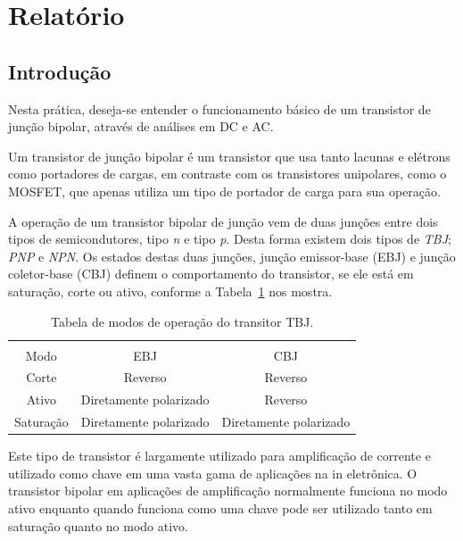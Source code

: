 \documentclass[12pt,a4paper]{article}
\begin{document}
\setcounter{figure}{2}
\setcounter{section}{3}
\setcounter{page}{5}
\section{Relatório}
\subsection{Introdução}

Nesta prática, deseja-se entender o funcionamento básico de um transistor de junção bipolar, através de análises em DC e AC. 

Um transistor de junção bipolar é um transistor que usa tanto lacunas e elétrons como portadores de cargas, 
em contraste com os transistores unipolares, como o MOSFET, que apenas utiliza um tipo de portador de carga para sua operação. 

A operação de um transistor bipolar de junção vem de duas junções entre dois tipos de semicondutores, tipo \emph{n} e tipo \emph{p}. 
Desta forma existem dois tipos de \emph{TBJ}; \emph{PNP} e \emph{NPN}.  Os estados destas duas junções, junção emissor-base (EBJ) e
junção coletor-base (CBJ) definem o comportamento do transistor, se ele está em saturação, corte ou ativo, conforme a Tabela~\ref{tab:operacao}  %
nos mostra.  

\begin{table}[htpb]
  \centering
  \caption{Tabela de modos de operação do transitor TBJ. }
  \label{tab:operacao}
  \begin{tabular}{c c c}
    \toprule  \\
    Modo       & EBJ                    & CBJ                    \\ \midrule
    Corte      & Reverso                & Reverso                \\ \midrule
    Ativo      & Diretamente polarizado & Reverso                \\ \midrule
    Saturação  & Diretamente polarizado & Diretamente polarizado \\ \bottomrule
  \end{tabular}
\end{table}

Este tipo de transistor é largamente utilizado para amplificação de corrente e utilizado como chave em uma vasta gama de aplicações 
na in eletrônica. O transistor bipolar em aplicações de amplificação normalmente funciona no modo ativo enquanto
quando funciona como uma chave pode ser utilizado tanto em saturação quanto no modo ativo.
\end{document}
